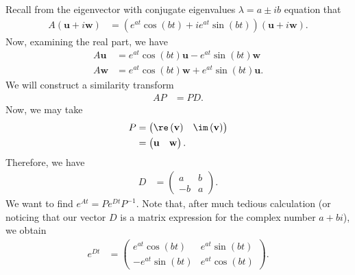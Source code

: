\documentclass[10pt]{mypackage}
\begin{document}
\begin{example}
  Recall from the eigenvector with conjugate eigenvalues $\lambda = a \pm ib$ equation that
  \begin{align*}
    A \left( \mathbf{u} + i\mathbf{w} \right) &= \left( e^{at}\cos\left( bt \right) + ie^{at}\sin\left( bt \right)\right)\left( \mathbf{u} + i\mathbf{w} \right).
  \end{align*}
  Now, examining the real part, we have
  \begin{align*}
    A\mathbf{u} &= e^{at}\cos\left( bt \right)\mathbf{u} - e^{at}\sin\left( bt \right) \mathbf{w}\\
    A \mathbf{w} &= e^{at}\cos\left( bt \right)\mathbf{w} + e^{at}\sin\left( bt \right) \mathbf{u}.
  \end{align*}
  We will construct a similarity transform
  \begin{align*}
    AP &= PD.
  \end{align*}
  Now, we may take
  \begin{align*}
    P &= \begin{pmatrix}\re\left( \mathbf{v} \right) & \im\left( \mathbf{v} \right)\end{pmatrix}\\
      &= \begin{pmatrix}\mathbf{u} & \mathbf{w}\end{pmatrix}.
  \end{align*}
  Therefore, we have
  \begin{align*}
    D &= \begin{pmatrix}a & b \\ -b & a\end{pmatrix}.
  \end{align*}
  We want to find $e^{At} = Pe^{Dt}P^{-1}$. Note that, after much tedious calculation (or noticing that our vector $D$ is a matrix expression for the complex number $a + bi$), we obtain
  \begin{align*}
    e^{Dt} &= \begin{pmatrix}e^{at}\cos\left( bt \right) & e^{at}\sin\left( bt \right)\\-e^{at}\sin\left( bt \right) & e^{at}\cos\left( bt \right)\end{pmatrix}.
  \end{align*}
\end{example}
\end{document}
